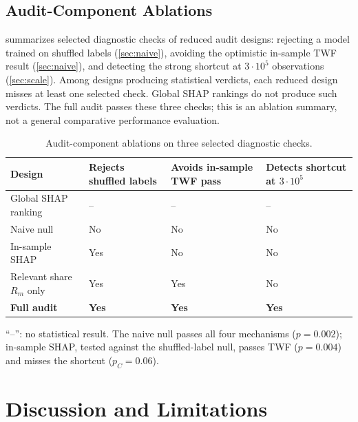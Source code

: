 \documentclass[conference]{IEEEtran}
\begin{document}
\subsection{Audit-Component Ablations}
\label{sec:compare}

 summarizes selected diagnostic checks of reduced audit designs: rejecting a model trained on shuffled labels (\cref{sec:naive}), avoiding the optimistic in-sample TWF result (\cref{sec:naive}), and detecting the strong shortcut at $3\cdot10^5$ observations (\cref{sec:scale}). Among designs producing statistical verdicts, each reduced design misses at least one selected check. Global SHAP rankings do not produce such verdicts. The full audit passes these three checks; this is an ablation summary, not a general comparative performance evaluation.

\begin{table}[t]
\centering
\begin{threeparttable}
\caption{Audit-component ablations on three selected diagnostic checks.}
\label{tab:compare}
\footnotesize
\setlength{\tabcolsep}{3pt}
\begin{tabular}{@{}l>{\centering\arraybackslash}b{1.25cm}>{\centering\arraybackslash}b{1.25cm}>{\centering\arraybackslash}b{1.25cm}@{}}
\toprule
Design & Rejects shuffled labels & Avoids in-sample TWF pass & Detects shortcut at $3\cdot10^5$ \\
\midrule
Global SHAP ranking~\cite{milling2025shap} & -- & -- & -- \\
Naive null & No & No & No \\
In-sample SHAP & Yes & No & No \\
Relevant share $R_m$ only & Yes & Yes & No \\
\addlinespace
\textbf{Full audit} & \textbf{Yes} & \textbf{Yes} & \textbf{Yes} \\
\bottomrule
\end{tabular}
\begin{tablenotes}[flushleft]
\footnotesize
\item ``--'': no statistical result. The naive null passes all four
mechanisms ($p=0.002$); in-sample SHAP, tested against the shuffled-label
null, passes TWF ($p=0.004$) and misses the shortcut ($p_C=0.06$).
\end{tablenotes}
\end{threeparttable}
\end{table}

\section{Discussion and Limitations}
\label{sec:limits_future}
\end{document}
